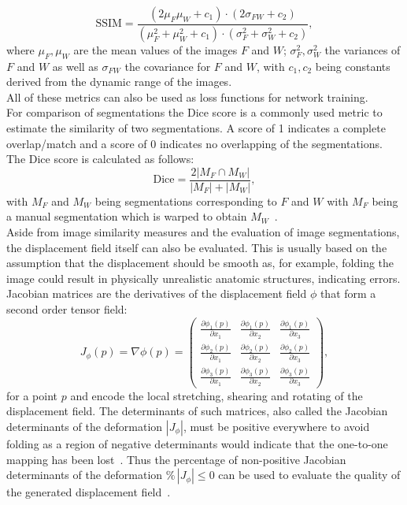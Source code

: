 \begin{equation}
	\text{SSIM} = \frac{(2 \mu_F \mu_W + c_1) \cdot (2 \sigma_{FW} + c_2)}{(\mu_F^2 + \mu_W^2 + c_1) \cdot (\sigma_F^2 + \sigma_W^2 + c_2) },
\end{equation}
where $\mu_F, \mu_W$ are the mean values of the images $F$ and $W$; $\sigma_F^2, \sigma_W^2$ the variances of $F$ and $W$ as well as $\sigma_{FW}$ the covariance for $F$ and $W$, with $c_1, c_2$ being constants derived from the dynamic range of the images. \\
All of these metrics can also be used as loss functions for network training.\\
For comparison of segmentations the Dice score is a commonly used metric to estimate the similarity of two segmentations. A score of 1 indicates a complete overlap/match and a score of 0 indicates no overlapping of the segmentations. The Dice score is calculated as follows:
\begin{equation}
	\text{Dice} = \frac{2 |M_F \cap M_W|}{|M_F| + |M_W|},
\end{equation}
with $M_F$ and $M_W$ being segmentations corresponding to $F$ and $W$ with $M_F$ being a manual segmentation which is warped to obtain $M_W$~\cite{NiftiReg}.\\
Aside from image similarity measures and the evaluation of image segmentations, the displacement field itself can also be evaluated. This is usually based on the assumption that the displacement should be smooth as, for example, folding the image could result in physically unrealistic anatomic structures, indicating errors. Jacobian matrices are the derivatives of the displacement field $\phi$ that form a second order tensor field:
\begin{equation}
	J_{\phi}(p) = \nabla \mathbb{\phi} (p) = \begin{pmatrix}
	\frac{\partial \phi_1(p)}{\partial x_1} & \frac{\partial \phi_1(p)}{\partial x_2} & \frac{\partial \phi_1(p)}{\partial x_3} \\
	\frac{\partial \phi_2(p)}{\partial x_1} & \frac{\partial \phi_2(p)}{\partial x_2} & \frac{\partial \phi_2(p)}{\partial x_3} \\
	\frac{\partial \phi_3(p)}{\partial x_1} & \frac{\partial \phi_3(p)}{\partial x_2} & \frac{\partial \phi_3(p)}{\partial x_3} 
	\end{pmatrix},
\end{equation}
for a point $p$ and encode the local stretching, shearing and rotating of the displacement field. The determinants of such matrices, also called the Jacobian determinants of the deformation $|J_{\phi}|$, must be positive everywhere to avoid folding as a region of negative determinants would indicate that the one-to-one mapping has been lost~\cite{DARTEL}. Thus the percentage of non-positive Jacobian determinants of the deformation $\% \, |J_{\phi}|\leq0$ can be used to evaluate the quality of the generated displacement field~\cite{Chen2023}.
